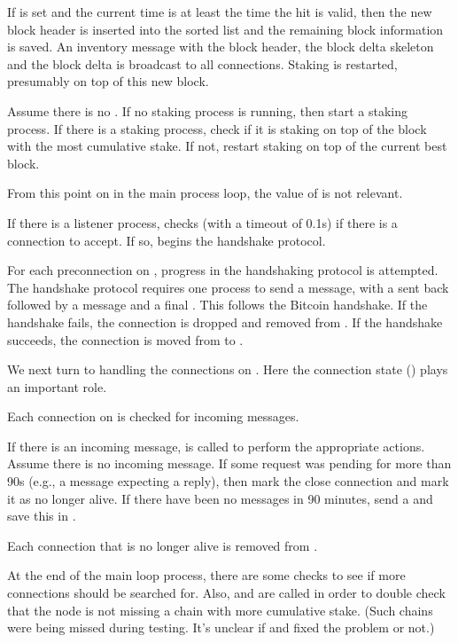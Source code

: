 If {} is set and the current time is at least the time the hit is valid,
then the new block header is inserted into the sorted {} list
and the remaining block information is saved.
An inventory message with the block header, the block delta skeleton and the block delta
is broadcast to all connections.
Staking is restarted, presumably on top of this new block.

Assume there is no {}.
If no staking process is running, then start a staking process.
If there is a staking process, check if it is staking on top of the block with the most
cumulative stake. If not, restart staking on top of the current best block.

From this point on in the main process loop, the value of {} is not relevant.

If there is a listener process, {} checks (with a timeout of 0.1s)
if there is a connection to accept. If so, {} begins the
handshake protocol.

For each preconnection on {}, progress in the handshaking protocol is attempted.
The handshake protocol requires one process to send a {} message,
with a {} sent back followed by a {} message
and a final {}. This follows the Bitcoin handshake.
If the handshake fails, the connection is dropped and removed from {}.
If the handshake succeeds, the connection is moved from {} to {}.

We next turn to handling the connections on {}.
Here the connection state ({}) plays an important role.

Each connection on {} is checked for incoming messages.

If there is an incoming message, {} is called to
perform the appropriate actions.
Assume there is no incoming message.
If some request was pending for more than 90s (e.g., a {} message
expecting a {} reply), then mark the close connection 
and mark it as no longer alive. If there have been no messages in 90 minutes,
send a {} and save this in {}.

Each connection that is no longer alive is removed from {}.

At the end of the main loop process, there are some checks to see if more connections should be searched
for. Also, {} and {}
are called in order to double check that the node is not missing a chain with more cumulative stake.
(Such chains were being missed during testing. It's unclear if 
{} and {} fixed the problem or not.)






